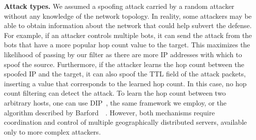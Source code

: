 {\bf Attack types.}
We assumed a spoofing attack carried by a random attacker without any knowledge of the network topology. In reality, some attackers may be able to obtain information about the network that could help subvert the defense. For example, if an attacker controls multiple bots, it can send the attack from the bots that have a more popular hop count value to the target. This maximizes the likelihood of passing by our filter as there are more IP addresses with which to spoof the source.
%
Furthermore, if the attacker learns the hop count between the spoofed IP and the target, it can also spoof the TTL field of the attack packets, inserting a value that corresponds to the learned hop count. In this case, no hop count filtering can detect the attack. To learn the hop count between two arbitrary hosts, one can use DIP~\citep{dip}, the same framework we employ, or the algorithm described by Barford~\etal{}~\citep{barford-infocom}. However, both mechanisms require coordination and control of multiple geographically distributed servers, available only to more complex attackers.









